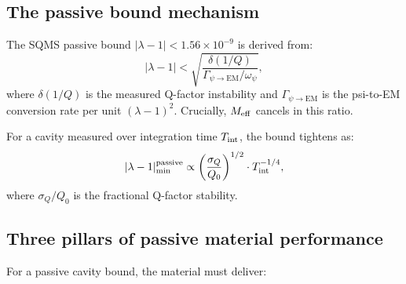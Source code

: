 \documentclass[11pt]{article}
\theoremstyle{definition}
\theoremstyle{remark}
\newcommand{\ee}[1]{\times 10^{#1}}
\newcommand{\Meff}{M_{\rm eff}}
\newcommand{\Opsi}{\omega_\psi}
\newcommand{\lambdabound}{1.56\ee{-9}}
\newcommand{\lam}{|\lambda-1|}
\begin{document}
\subsection{The passive bound mechanism}

The SQMS passive bound $\lam < \lambdabound$ is derived from:
\begin{equation}
  \lam < \sqrt{\frac{\delta(1/Q)}{\Gamma_{\psi\to\mathrm{EM}}/\Opsi}},
  \label{eq:passive_bound}
\end{equation}
where $\delta(1/Q)$ is the measured Q-factor instability and
$\Gamma_{\psi\to\mathrm{EM}}$ is the psi-to-EM conversion rate per
unit $(\lambda-1)^2$. Crucially, $\Meff$ cancels in this ratio.

For a cavity measured over integration time $T_{\rm int}$, the bound
tightens as:
\begin{equation}
  \lam_{\rm min}^{\rm passive} \propto
  \left(\frac{\sigma_Q}{Q_0}\right)^{1/2}
  \cdot T_{\rm int}^{-1/4},
  \label{eq:passive_scaling}
\end{equation}
where $\sigma_Q/Q_0$ is the fractional Q-factor stability.

\subsection{Three pillars of passive material performance}

For a passive cavity bound, the material must deliver:
\end{document}
